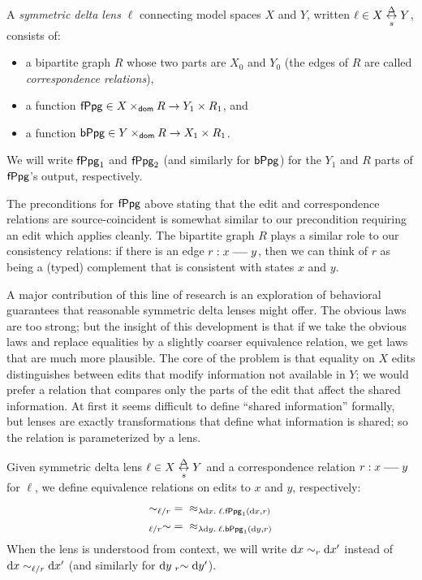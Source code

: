 \begin{definition}
    A \emph{symmetric delta lens} $\ell$ connecting model spaces $X$ and
    $Y$, written $\ell \in X \underset{s}{\overset{\Delta}{\leftrightarrow}} Y$, consists of:
    \begin{itemize}
        \item a bipartite graph $R$ whose two parts are $X_0$ and $Y_0$ (the
            edges of $R$ are called \emph{correspondence relations}),
        \item a function $\mathsf{fPpg} \in X \times_{\mathsf{dom}} R \to Y_1 \times R_1$,
            and
        \item a function $\mathsf{bPpg} \in Y \times_{\mathsf{dom}} R \to X_1 \times R_1$.
    \end{itemize}
    We will write $\mathsf{fPpg}_1$ and $\mathsf{fPpg}_2$ (and similarly for $\mathsf{bPpg}$)
    for the $Y_1$ and $R$ parts of $\mathsf{fPpg}$'s output, respectively.
\end{definition}

The preconditions for $\mathsf{fPpg}$ above stating that the edit and
correspondence relations are source-coincident is somewhat similar to our
precondition requiring an edit which applies cleanly. The bipartite graph
$R$ plays a similar role to our consistency relations: if there is an edge
$r : x \uedge y$, then we can think of $r$ as being a (typed) complement
that is consistent with states $x$ and $y$.

A major contribution of this line of research is an exploration of
behavioral guarantees that reasonable symmetric delta lenses might offer.
The obvious laws are too strong; but the insight of this development is that
if we take the obvious laws and replace equalities by a slightly coarser
equivalence relation, we get laws that are much more plausible. The core of
the problem is that equality on $X$ edits distinguishes between edits that
modify information not available in $Y$; we would prefer a relation that
compares only the parts of the edit that affect the shared information.
At first it seems difficult to define ``shared information'' formally, but
lenses are exactly transformations that define what information is shared;
so the relation is parameterized by a lens.

\begin{definition}
    Given symmetric delta lens $\ell \in X \underset{s}{\overset{\Delta}{\leftrightarrow}} Y$ and a correspondence
    relation $r : x \uedge y$ for $\ell$, we define equivalence relations on
    edits to $x$ and $y$, respectively:
    \begin{align*}
        \eqsharedl*\ell r &={} \under_{\lambda \dx.\;\ell.\mlfppg_1(\dx,r)} \\
        \eqsharedr*\ell r &={} \under_{\lambda \dy.\;\ell.\mlbppg_1(\dy,r)}
    \end{align*}
    When the lens is understood from context, we will write $\dx\eqsharedl
    r\dx'$ instead of $\dx\eqsharedl*\ell r\dx'$ (and similarly for
    $\dy\eqsharedr r\dy'$).
\end{definition}

